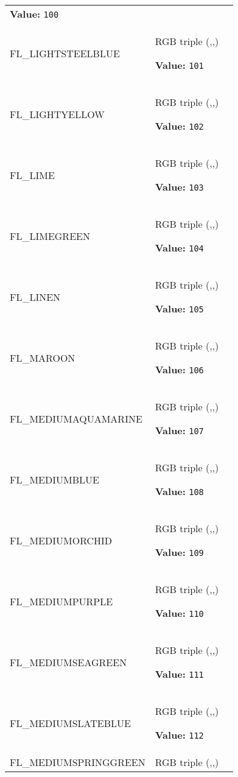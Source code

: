 \begin{longtable}{|p{\varnamewidth}|p{\vardescrwidth}|l}
\textbf{Value:} 
{\tt 100}&\\
\cline{1-2}
\raggedright F\-L\-\_\-L\-I\-G\-H\-T\-S\-T\-E\-E\-L\-B\-L\-U\-E\- & \raggedright RGB triple (,,)

\textbf{Value:} 
{\tt 101}&\\
\cline{1-2}
\raggedright F\-L\-\_\-L\-I\-G\-H\-T\-Y\-E\-L\-L\-O\-W\- & \raggedright RGB triple (,,)

\textbf{Value:} 
{\tt 102}&\\
\cline{1-2}
\raggedright F\-L\-\_\-L\-I\-M\-E\- & \raggedright RGB triple (,,)

\textbf{Value:} 
{\tt 103}&\\
\cline{1-2}
\raggedright F\-L\-\_\-L\-I\-M\-E\-G\-R\-E\-E\-N\- & \raggedright RGB triple (,,)

\textbf{Value:} 
{\tt 104}&\\
\cline{1-2}
\raggedright F\-L\-\_\-L\-I\-N\-E\-N\- & \raggedright RGB triple (,,)

\textbf{Value:} 
{\tt 105}&\\
\cline{1-2}
\raggedright F\-L\-\_\-M\-A\-R\-O\-O\-N\- & \raggedright RGB triple (,,)

\textbf{Value:} 
{\tt 106}&\\
\cline{1-2}
\raggedright F\-L\-\_\-M\-E\-D\-I\-U\-M\-A\-Q\-U\-A\-M\-A\-R\-I\-N\-E\- & \raggedright RGB triple (,,)

\textbf{Value:} 
{\tt 107}&\\
\cline{1-2}
\raggedright F\-L\-\_\-M\-E\-D\-I\-U\-M\-B\-L\-U\-E\- & \raggedright RGB triple (,,)

\textbf{Value:} 
{\tt 108}&\\
\cline{1-2}
\raggedright F\-L\-\_\-M\-E\-D\-I\-U\-M\-O\-R\-C\-H\-I\-D\- & \raggedright RGB triple (,,)

\textbf{Value:} 
{\tt 109}&\\
\cline{1-2}
\raggedright F\-L\-\_\-M\-E\-D\-I\-U\-M\-P\-U\-R\-P\-L\-E\- & \raggedright RGB triple (,,)

\textbf{Value:} 
{\tt 110}&\\
\cline{1-2}
\raggedright F\-L\-\_\-M\-E\-D\-I\-U\-M\-S\-E\-A\-G\-R\-E\-E\-N\- & \raggedright RGB triple (,,)

\textbf{Value:} 
{\tt 111}&\\
\cline{1-2}
\raggedright F\-L\-\_\-M\-E\-D\-I\-U\-M\-S\-L\-A\-T\-E\-B\-L\-U\-E\- & \raggedright RGB triple (,,)

\textbf{Value:} 
{\tt 112}&\\
\cline{1-2}
\raggedright F\-L\-\_\-M\-E\-D\-I\-U\-M\-S\-P\-R\-I\-N\-G\-G\-R\-E\-E\-N\- & \raggedright RGB triple (,,)


\end{longtable}
